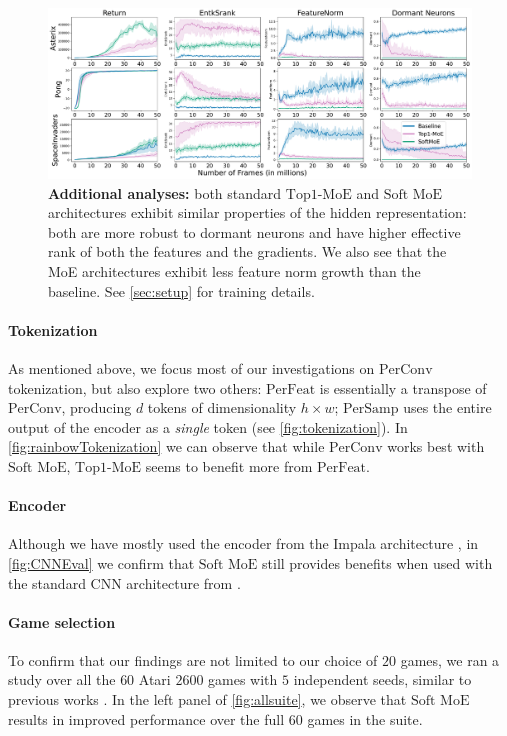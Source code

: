 \documentclass{article}
\theoremstyle{plain}
\theoremstyle{definition}
\theoremstyle{remark}
\newcommand{\moe}{$\textrm{Top1-MoE}$}
\newcommand{\softmoe}{$\textrm{Soft MoE}$}
\newcommand{\token}[1]{$\textrm{#1}$}
\begin{document}
\ifarxiv
    \begin{figure}[!t]
        \centering
        \includegraphics[width=\linewidth]{figures/analyses3Games.pdf}
        \caption{{\bf Additional analyses:} both standard \moe{} and \softmoe{} architectures exhibit similar properties of the hidden representation: both are more robust to dormant neurons and have higher effective rank of both the features and the gradients. We also see that the MoE architectures exhibit less feature norm growth than the baseline. See \cref{sec:setup} for training details.}
        \label{fig:feature-statistics}
    \end{figure}
\fi

\paragraph{Tokenization} As mentioned above, we focus most of our investigations on \token{PerConv} tokenization, but also explore two others: \token{PerFeat} is essentially a transpose of \token{PerConv}, producing $d$ tokens of dimensionality $h\times w$; \token{PerSamp} uses the entire output of the encoder as a {\em single} token (see \cref{fig:tokenization}). In \cref{fig:rainbowTokenization} we can observe that while \token{PerConv} works best with \softmoe{}, \moe{} seems to benefit more from \token{PerFeat}.



\paragraph{Encoder} Although we have mostly used the encoder from the Impala architecture \citep{espeholt2018impala}, in \cref{fig:CNNEval} we confirm that \softmoe{} still provides benefits when used with the standard CNN architecture from \citet{mnih2015humanlevel}.


\paragraph{Game selection}
To confirm that our findings are not limited to our choice of $20$ games, we ran a study over all the $60$ Atari $2600$ games with $5$ independent seeds, similar to previous works \citep{fedus2020revisiting, ceron2023small}. In the left panel of \cref{fig:allsuite}, we observe that \softmoe{} results in improved performance over the full 60 games in the suite.
\end{document}
